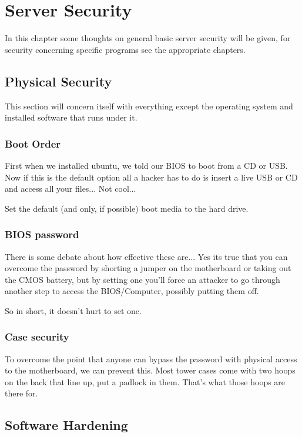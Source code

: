 \chapter{Server Security}
\label{chp:bserversec}

In this chapter some thoughts on general basic server security will be given, for security concerning specific programs see the appropriate chapters.

\section{Physical Security}

This section will concern itself with everything except the operating system and installed software that runs under it.

\subsection{Boot Order}
First when we installed ubuntu, we told our BIOS to boot from a CD or USB.  Now if this is the default option all a hacker has to do is insert a live USB or CD and access all your files...  Not cool...

Set the default (and only, if possible) boot media to the hard drive.

\subsection{BIOS password}

There is some debate about how effective these are... Yes its true that you can overcome the password by shorting a jumper on the motherboard or taking out the CMOS battery, but by setting one you'll force an attacker to go through another step to access the BIOS/Computer, possibly putting them off.

So in short, it doesn't hurt to set one.

\subsection{Case security}

To overcome the point that anyone can bypass the password with physical access to the motherboard, we can prevent this.  Most tower cases come with two hoops on the back that line up, put a padlock in them.  That's what those hoops are there for.


\section{Software Hardening}

